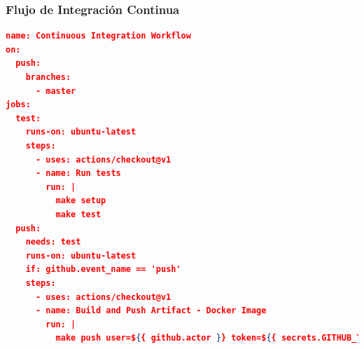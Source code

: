 \documentclass[a4paper,11pt]{book}
\begin{document}
\subsubsection{Flujo de Integración Continua}\label{anexci}

\begin{lstlisting}[language=json,firstnumber=1]
name: Continuous Integration Workflow
on:
  push:
    branches:
      - master
jobs:
  test:
    runs-on: ubuntu-latest
    steps:
      - uses: actions/checkout@v1
      - name: Run tests
        run: |
          make setup
          make test
  push:
    needs: test
    runs-on: ubuntu-latest
    if: github.event_name == 'push'
    steps:
      - uses: actions/checkout@v1
      - name: Build and Push Artifact - Docker Image
        run: |
          make push user=${{ github.actor }} token=${{ secrets.GITHUB_TOKEN }}
\end{lstlisting}

\thispagestyle{empty}


\end{document}
